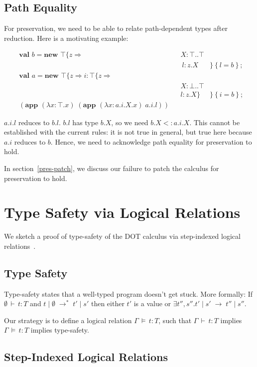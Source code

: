 \documentclass[9pt]{sigplanconf}
\newcommand{\ts}{\,\vdash\,}
\newcommand{\typ}{:}
\newcommand{\reduces}{\;\rightarrow\;}
\newcommand{\mlrefine}[2]{\{#1 \Rightarrow #2 \}}
\newcommand{\ldefs}[1]{\left\{#1\right\}}
\newcommand{\abs}[3]{\lambda #1\!:\!#2.#3}
\newcommand{\mlnew}[3]{\textbf{val }#1 = \textbf{new }#2 ;\;\\&#3}
\newcommand{\Ldecl}[3]{#1 : #2..#3}%
\newcommand{\ldecl}[2]{#1 : #2}
\newcommand{\Top}{\top}%
\newcommand{\Bot}{\bot}%
\newcommand{\reduction}[4]{#1 \operatorname{|} #2 \reduces #3 \operatorname{|} #4}
\newcommand{\app}[2]{(\textbf{app }#1\;#2)}
\newcommand{\reductionl}[5]{#1 \operatorname{|} #2 \;\rightarrow^{#5}\; #3 \operatorname{|} #4}
\newcommand{\ds}{\,\vDash\,}
\begin{document}
\subsection{Path Equality}\label{patheq}

For preservation, we need to be able to relate path-dependent types
after reduction. Here is a motivating example:

\begin{align*}
&\mlnew b {\Top \mlrefine z {&&\Ldecl X \Top \Top&\\
&&&\ \ldecl l {z.X}&}\ldefs{l = b}}{
\mlnew a {\Top \mlrefine z {\ldecl i {\Top \mlrefine z {&&&\\
&&&\Ldecl X \Bot \Top\\
&&&\ldecl l {z.X}}}&}\ldefs{i = b}}}{
\app {(\abs x \Top x)} {\app {(\abs x {a.i.X} x)} {a.i.l}}}
\end{align*}

$a.i.l$ reduces to $b.l$. $b.l$ has type $b.X$, so we need $b.X <:
a.i.X$. This cannot be established with the current rules: it is not
true in general, but true here because $a.i$ reduces to $b$. Hence,
we need to acknowledge path equality for preservation to hold.

In section~\ref{pres-patch}, we discuss our failure to patch the
calculus for preservation to hold.

\section{Type Safety via Logical Relations}\label{dot-type-safety}
We sketch a proof of type-safety of the DOT calculus via step-indexed
logical relations~\cite{ahmed04,ahmed06,step_indexed_obj}.

\subsection{Type Safety}
Type-safety states that a well-typed program doesn't get stuck. More
formally: If $\emptyset \ts t \typ T$ and $\reductionl t \emptyset {t'} {s'} *$ then
either $t'$ is a value or $\exists t'', s''. \reduction {t'} {s'}
{t''} {s''}$.

Our strategy is to define a logical relation $\Gamma \ds t : T$, such
that $\Gamma \ts t : T$ implies $\Gamma \ds t : T$ implies
type-safety.

\subsection{Step-Indexed Logical Relations}
\end{document}
